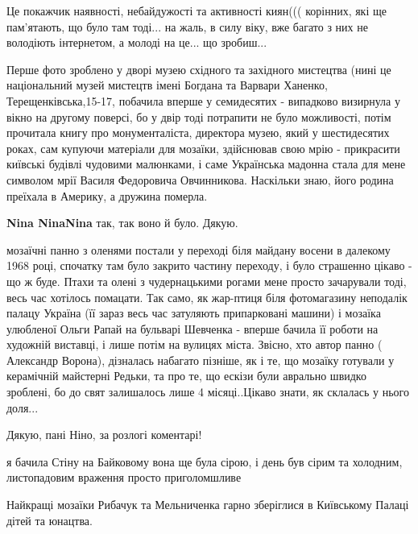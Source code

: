 \begin{itemize}
Це покажчик наявності, небайдужості та активності киян((( корінних, які ще
пам'ятають, що було там тоді... на жаль, в силу віку, вже багато з них не
володіють інтернетом, а молоді на це... що зробиш...


Перше фото зроблено у дворі музею східного та західного мистецтва (нині це
національний музей мистецтв імені Богдана та Варвари Ханенко,
Терещенківська,15-17, побачила вперше у семидесятих - випадково визирнула у
вікно на другому поверсі, бо у двір тоді потрапити не було можливості, потім
прочитала книгу про монументаліста, директора музею, який у шестидесятих роках,
сам купуючи матеріали для мозаїки, здійснював свою мрію - прикрасити київські
будівлі чудовими малюнками, і саме Українська мадонна стала для мене символом
мрії Василя Федоровича Овчинникова. Наскільки знаю, його родина преїхала в
Америку, а дружина померла.

\begin{itemize} %
\textbf{Nina NinaNina} так, так воно й було. Дякую.
\end{itemize} %


мозаїчні панно з оленями постали у переході біля майдану восени в далекому 1968
році, спочатку там було закрито частину переходу, і було страшенно цікаво - що
ж буде. Птахи та олені з чудернацькими рогами мене просто зачарували тоді, весь
час хотілось помацати. Так само, як жар-птиця біля фотомагазину неподалік
палацу Україна (її зараз весь час затуляють припарковані машини) і мозаїка
улюбленої Ольги Рапай на бульварі Шевченка - вперше бачила її роботи на
художній виставці, і лише потім на вулицях міста. Звісно, хто автор панно (
Александр Ворона), дізналась набагато пізніше, як і те, що мозаїку готували у
керамічній майстерні Редьки, та про те, що ескізи були аврально швидко
зроблені, бо до свят залишалось лише 4 місяці..Цікаво знати, як склалась у
нього доля...

\begin{itemize} %
Дякую, пані Ніно, за розлогі коментарі!
\end{itemize} %


я бачила Стіну на Байковому вона ще була сірою, і день був сірим та холодним,
листопадовим враження просто приголомшливе


Найкращі мозаїки Рибачук та Мельниченка гарно зберіглися в Київському Палаці
дітей та юнацтва.

\end{itemize} %
